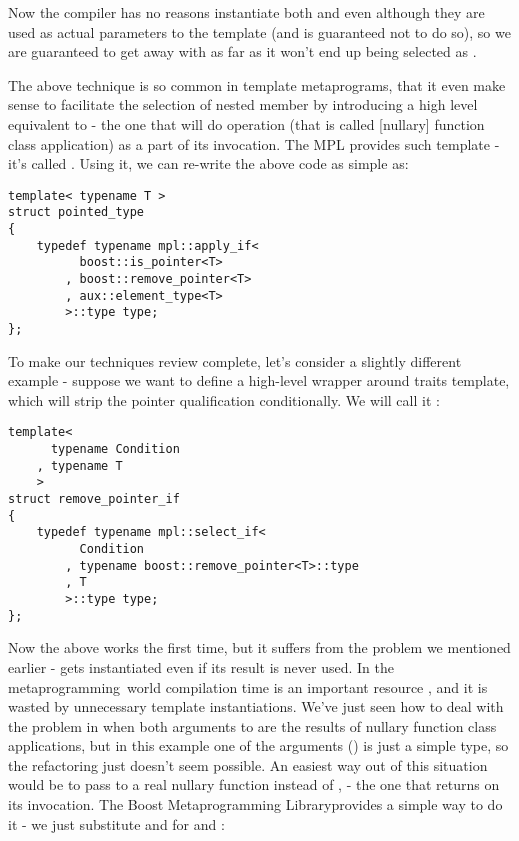 \documentclass{kapproc}
\newcommand{\Mpl}{Boost Meta\-pro\-gram\-ming Library}
\newcommand{\mping}{meta\-pro\-gram\-ming}
\begin{document}
Now the compiler has no reasons instantiate both 
 and 
 even although they are used as 
actual parameters to the  template (and is 
guaranteed not to do so), so we are guaranteed to get away with 
 as far as it won't end up being 
selected as .

The above technique is so common in template metaprograms, that it
even make sense to facilitate the selection of nested  member
by introducing a high level equivalent to  - the one
that will do  operation (that is called [nullary]
function class application) as a part of its invocation.  The MPL
provides such template - it's called . Using it, we
can re-write the above code as simple as:

{\small
\begin{codesamp}\begin{verbatim}
template< typename T >
struct pointed_type
{
    typedef typename mpl::apply_if<
          boost::is_pointer<T>
        , boost::remove_pointer<T>
        , aux::element_type<T>
        >::type type;
};
\end{verbatim}
\end{codesamp}
}

To make our techniques review complete, let's consider a slightly 
different example - suppose we want to define a high-level wrapper 
around  traits template, which will 
strip the pointer qualification conditionally. We will call it 
:

{\small
\begin{codesamp}\begin{verbatim}
template<
      typename Condition
    , typename T
    >
struct remove_pointer_if
{
    typedef typename mpl::select_if<
          Condition
        , typename boost::remove_pointer<T>::type
        , T
        >::type type;
};
\end{verbatim}
\end{codesamp}
}

Now the above works the first time, but it suffers from the problem we
mentioned earlier -  gets
instantiated even if its result is never used. In the \mping\ world
compilation time is an important resource \cite{Abr01}, and it is
wasted by unnecessary template instantiations. We've just seen how to
deal with the problem in when both arguments to 
are the results of nullary function class applications, but in this
example one of the arguments () is just a simple type,
so the refactoring just doesn't seem possible. An easiest way out of
this situation would be to pass to  a real nullary
function instead of , - the one that returns  on its
invocation. The \Mpl provides a simple way to do it - we just
substitute  and  for  and
:
\end{document}
